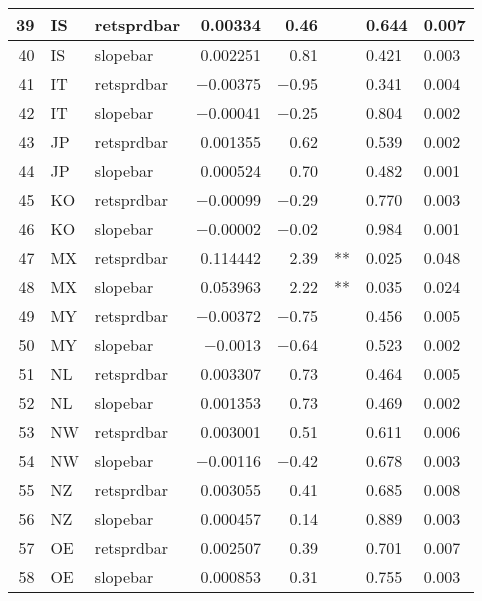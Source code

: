 \begin{longtable}{|r|l|l|r|r|l|l|l|}
   39 &    IS &    retsprdbar &    0.00334 &    0.46 &      &    0.644 &    0.007\\\hline
   40 &    IS &    slopebar &    0.002251 &    0.81 &      &    0.421 &    0.003\\\hline
   41 &    IT &    retsprdbar &    $-$0.00375 &    $-$0.95 &      &    0.341 &    0.004\\\hline
   42 &    IT &    slopebar &    $-$0.00041 &    $-$0.25 &      &    0.804 &    0.002\\\hline
   43 &    JP &    retsprdbar &    0.001355 &    0.62 &      &    0.539 &    0.002\\\hline
   44 &    JP &    slopebar &    0.000524 &    0.70 &      &    0.482 &    0.001\\\hline
   45 &    KO &    retsprdbar &    $-$0.00099 &    $-$0.29 &      &    0.770 &    0.003\\\hline
   46 &    KO &    slopebar &    $-$0.00002 &    $-$0.02 &      &    0.984 &    0.001\\\hline
   47 &    MX &    retsprdbar &    0.114442 &    2.39 &    ** &    0.025 &    0.048\\\hline
   48 &    MX &    slopebar &    0.053963 &    2.22 &    ** &    0.035 &    0.024\\\hline
   49 &    MY &    retsprdbar &    $-$0.00372 &    $-$0.75 &      &    0.456 &    0.005\\\hline
   50 &    MY &    slopebar &    $-$0.0013 &    $-$0.64 &      &    0.523 &    0.002\\\hline
   51 &    NL &    retsprdbar &    0.003307 &    0.73 &      &    0.464 &    0.005\\\hline
   52 &    NL &    slopebar &    0.001353 &    0.73 &      &    0.469 &    0.002\\\hline
   53 &    NW &    retsprdbar &    0.003001 &    0.51 &      &    0.611 &    0.006\\\hline
   54 &    NW &    slopebar &    $-$0.00116 &    $-$0.42 &      &    0.678 &    0.003\\\hline
   55 &    NZ &    retsprdbar &    0.003055 &    0.41 &      &    0.685 &    0.008\\\hline
   56 &    NZ &    slopebar &    0.000457 &    0.14 &      &    0.889 &    0.003\\\hline
   57 &    OE &    retsprdbar &    0.002507 &    0.39 &      &    0.701 &    0.007\\\hline
   58 &    OE &    slopebar &    0.000853 &    0.31 &      &    0.755 &    0.003\\\hline

\end{longtable}
